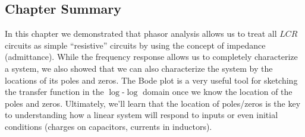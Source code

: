 \subsection{Chapter Summary}
In this chapter we demonstrated that phasor analysis allows us to treat all $LCR$ circuits as simple “resistive” circuits by using the concept of impedance (admittance).  While the frequency response allows us to completely characterize a system, we also showed that we can also characterize the system by the locations of its poles and zeros.  The Bode plot is a very useful tool for sketching the transfer function in the $\log$-$\log$ domain once we know the location of the poles and zeros.  Ultimately, we'll learn that the location of poles/zeros is the key to understanding how a linear system will respond to inputs or even initial conditions (charges on capacitors, currents in inductors).

